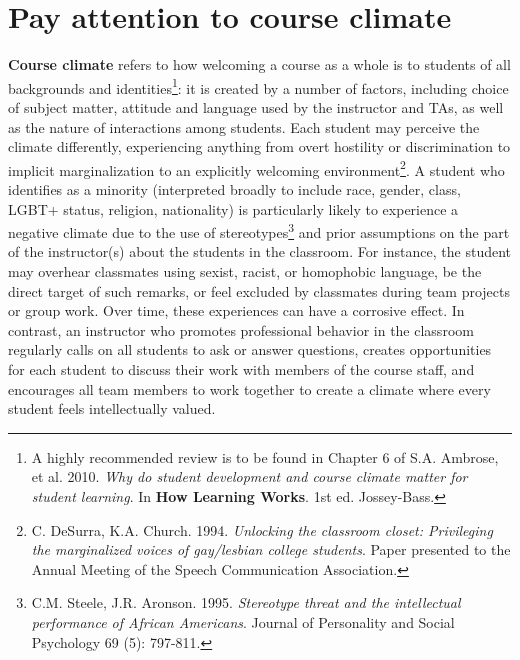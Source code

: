 \section {Pay attention to course climate}
\label{course-climate}
\textbf{Course climate} refers to how welcoming a course as a whole is to students of all backgrounds and identities\footnote{A highly recommended review is to be found in Chapter 6 of S.A. Ambrose, et al. 2010. \emph{Why do student development and course climate matter for student learning}. In \textbf{How Learning Works}. 1st ed. Jossey-Bass.}: it is created by a number of factors, including choice of subject matter, attitude and language used by the instructor and TAs, as well as the nature of interactions among students. Each student may perceive the climate differently, experiencing anything from overt hostility or discrimination to implicit marginalization to an explicitly welcoming environment\footnote{C. DeSurra, K.A. Church. 1994. \emph{Unlocking the classroom closet: Privileging the marginalized voices of gay/lesbian college students}. Paper presented to the Annual Meeting of the Speech Communication Association.}. A student who identifies as a minority (interpreted broadly to include race, gender, class, LGBT+ status, religion, nationality) is particularly likely to experience a negative climate due to the use of stereotypes\footnote{C.M. Steele, J.R. Aronson. 1995. \emph{Stereotype threat and the intellectual performance of African Americans}. Journal of Personality and Social Psychology 69 (5): 797-811.} and prior assumptions on the part of the instructor(s) about the students in the classroom. For instance, the student may overhear classmates using sexist, racist, or homophobic language, be the direct target of such remarks, or feel excluded by classmates during team projects or group work. Over time, these experiences can have a corrosive effect.   In contrast, an instructor who promotes professional behavior in the classroom regularly calls on all students to ask or answer questions, creates opportunities for each student to discuss their work with members of the course staff, and encourages all team members to work together to create a climate where every student feels intellectually valued.

